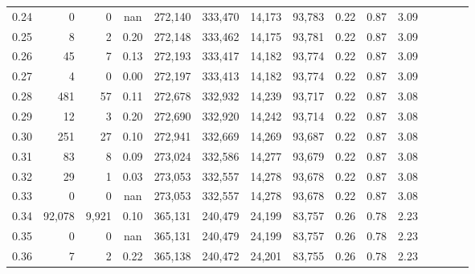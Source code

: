 \begin{tabular}{rrrcrrrrrrrrrrr}
0.24 &       0 &       0 &                                        nan &  272,140 &  333,470 &   14,173 &   93,783 &  0.22 &  0.87 &                         3.09 \\
0.25 &       8 &       2 &                                       0.20 &  272,148 &  333,462 &   14,175 &   93,781 &  0.22 &  0.87 &                         3.09 \\
0.26 &      45 &       7 &                                       0.13 &  272,193 &  333,417 &   14,182 &   93,774 &  0.22 &  0.87 &                         3.09 \\
0.27 &       4 &       0 &                                       0.00 &  272,197 &  333,413 &   14,182 &   93,774 &  0.22 &  0.87 &                         3.09 \\
0.28 &     481 &      57 &                                       0.11 &  272,678 &  332,932 &   14,239 &   93,717 &  0.22 &  0.87 &                         3.08 \\
0.29 &      12 &       3 &                                       0.20 &  272,690 &  332,920 &   14,242 &   93,714 &  0.22 &  0.87 &                         3.08 \\
0.30 &     251 &      27 &                                       0.10 &  272,941 &  332,669 &   14,269 &   93,687 &  0.22 &  0.87 &                         3.08 \\
0.31 &      83 &       8 &                                       0.09 &  273,024 &  332,586 &   14,277 &   93,679 &  0.22 &  0.87 &                         3.08 \\
0.32 &      29 &       1 &                                       0.03 &  273,053 &  332,557 &   14,278 &   93,678 &  0.22 &  0.87 &                         3.08 \\
0.33 &       0 &       0 &                                        nan &  273,053 &  332,557 &   14,278 &   93,678 &  0.22 &  0.87 &                         3.08 \\
0.34 &  92,078 &   9,921 &                                       0.10 &  365,131 &  240,479 &   24,199 &   83,757 &  0.26 &  0.78 &                         2.23 \\
0.35 &       0 &       0 &                                        nan &  365,131 &  240,479 &   24,199 &   83,757 &  0.26 &  0.78 &                         2.23 \\
0.36 &       7 &       2 &                                       0.22 &  365,138 &  240,472 &   24,201 &   83,755 &  0.26 &  0.78 &                         2.23 \\

\end{tabular}
